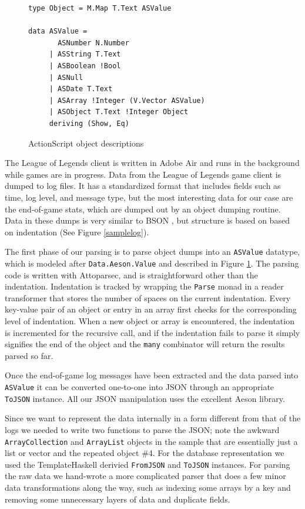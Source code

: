 \documentclass[letterpaper,twocolumn,9pt]{article}
\newcommand{\code}[1]{\texttt{#1}}
\begin{document}
\begin{figure}[h]
\footnotesize{
\begin{verbatim}
type Object = M.Map T.Text ASValue

data ASValue =
       ASNumber N.Number
     | ASString T.Text
     | ASBoolean !Bool
     | ASNull
     | ASDate T.Text
     | ASArray !Integer (V.Vector ASValue)
     | ASObject T.Text !Integer Object
     deriving (Show, Eq)
\end{verbatim}
}
    \caption{ActionScript object descriptions}
    \label{asvalue}
\end{figure}

The League of Legends client is written in Adobe Air and runs in the background while games are in progress. Data from the League of Legends game client is dumped to log files.  It has a standardized format that includes fields such as time, log level, and message type, but the most interesting data for our case are the end-of-game stats, which are dumped out by an object dumping routine.  Data in these dumps is very similar to BSON , but structure is based on based on indentation (See Figure \ref{samplelog}).

The first phase of our parsing is to parse object dumps into an \code{ASValue} datatype, which is modeled after \code{Data.Aeson.Value} and described in Figure \ref{asvalue}.  The parsing code is written with Attoparsec, and is straightforward other than the indentation.  Indentation is tracked by wrapping the \code{Parse} monad in a reader transformer that stores the number of spaces on the current indentation.  Every key-value pair of an object or entry in an array first checks for the corresponding level of indentation.  When a new object or array is encountered, the indentation is incremented for the recursive call, and if the indentation fails to parse it simply signifies the end of the object and the \code{many} combinator will return the results parsed so far.

Once the end-of-game log messages have been extracted and the data parsed into \code{ASValue} it can be converted one-to-one into JSON through an appropriate \code{ToJSON} instance.  All our JSON manipulation uses the excellent Aeson library.

Since we want to represent the data internally in a form different from that of the logs we needed to write two functions to parse the JSON; note the awkward \code{ArrayCollection} and \code{ArrayList} objects in the sample that are essentially just a list or vector and the repeated object \#4.  For the database representation we used the TemplateHaskell derivied \code{FromJSON} and \code{ToJSON} instances.  For parsing the raw data we hand-wrote a more complicated parser that does a few minor data transformations along the way, such as indexing some arrays by a key and removing some unnecessary layers of data and duplicate fields.
\end{document}
